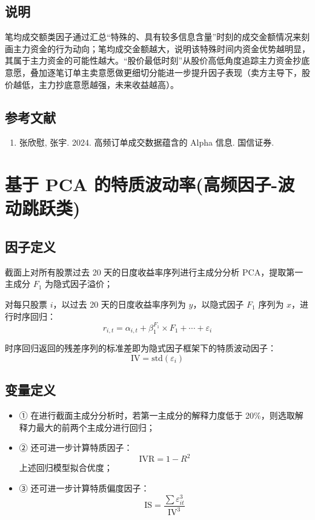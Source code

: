 \documentclass{article}
\begin{document}
\subsection{说明}
笔均成交额类因子通过汇总“特殊的、具有较多信息含量”时刻的成交金额情况来刻画主力资金的行为动向；笔均成交金额越大，说明该特殊时间内资金优势越明显，其属于主力资金的可能性越大。“股价最低时刻”从股价高低角度追踪主力资金抄底意愿，叠加逐笔订单主卖意愿做更细切分能进一步提升因子表现（卖方主导下，股价越低，主力抄底意愿越强，未来收益越高）。

\subsection{参考文献}
\begin{enumerate}
    \item 张欣慰, 张宇. 2024. 高频订单成交数据蕴含的 Alpha 信息. 国信证券.
\end{enumerate}

\section{基于 PCA 的特质波动率(高频因子-波动跳跃类)}

\subsection{因子定义}

截面上对所有股票过去 20 天的日度收益率序列进行主成分分析 PCA，提取第一主成分 \( F_1 \) 为隐式因子溢价；

对每只股票 \( i \)，以过去 20 天的日度收益率序列为 \( y \)，以隐式因子 \( F_1 \) 序列为 \( x \)，进行时序回归：
\begin{equation}
    r_{i,t} = \alpha_{i,t} + \beta_1^{F_1} \times F_1 + \cdots + \varepsilon_i
\end{equation}

时序回归返回的残差序列的标准差即为隐式因子框架下的特质波动因子：
\begin{equation}
    \mathrm{IV} = \mathrm{std}(\varepsilon_i)
\end{equation}

\subsection{变量定义}
\begin{itemize}
    \item ① 在进行截面主成分分析时，若第一主成分的解释力度低于 20\%，则选取解释力最大的前两个主成分进行回归；
    \item ② 还可进一步计算特质因子：
        \begin{equation*}
            \mathrm{IVR} = 1 - R^2
        \end{equation*}
        上述回归模型拟合优度；
    \item ③ 还可进一步计算特质偏度因子：
        \begin{equation*}
            \mathrm{IS} = \frac{\sum \varepsilon_{it}^3}{\mathrm{IV}^3}
        \end{equation*}
\end{itemize}
\end{document}
